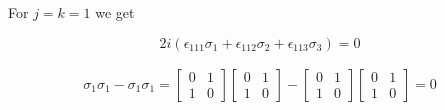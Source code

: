 \documentclass[11pt]{article}
\begin{document}
\begin{enumerate}
\begin{enumerate}
                For $j = k = 1$ we get

                \begin{equation*}
			            2i(\epsilon_{111} \sigma_1 + \epsilon_{112} \sigma_2 + \epsilon_{113} \sigma_3) = 0
                \end{equation*}

                \begin{align*}
                  \sigma_1 \sigma_1 - \sigma_1 \sigma_1 =
                  \begin{bmatrix}
                    0 & 1 \\ 1 & 0
                  \end{bmatrix}
                  \begin{bmatrix}
                    0 & 1 \\ 1 & 0
                  \end{bmatrix} -
                  \begin{bmatrix}
                    0 & 1 \\ 1 & 0
                  \end{bmatrix}
                  \begin{bmatrix}
                    0 & 1 \\ 1 & 0
                  \end{bmatrix} = 0
                \end{align*}

	      \end{enumerate}

\end{enumerate}

\end{document}
